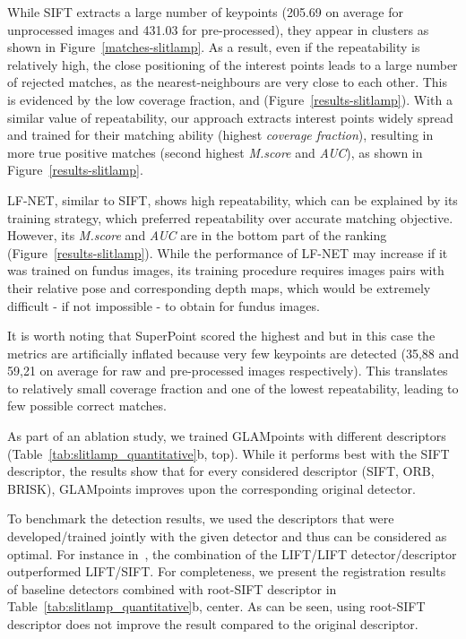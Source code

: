



While \ac{SIFT} extracts a large number of keypoints (205.69 on average for unprocessed images and 431.03 for pre-processed), they appear in clusters as shown in Figure~\ref{matches-slitlamp}. As a result, even if the repeatability is relatively high, the close positioning of the interest points leads to a large number of rejected matches, as the nearest-neighbours are very close to each other. This is evidenced by the low coverage fraction,  and  (Figure~\ref{results-slitlamp}). With a similar value of repeatability, our approach extracts interest points widely spread and trained for their matching ability (highest \textit{coverage fraction}), resulting in more true positive matches (second highest \textit{M.score} and \textit{AUC}), as shown in Figure~\ref{results-slitlamp}. 

\ac{LF-NET}, similar to SIFT, shows high repeatability, which can be explained by its training strategy, which preferred repeatability over accurate matching objective. However, its \textit{M.score} and \textit{AUC} are in the bottom part of the ranking (Figure~\ref{results-slitlamp}). While the performance of \ac{LF-NET} may increase if it was trained on fundus images, its training procedure requires images pairs with their relative pose and corresponding depth maps, which would be extremely difficult - if not impossible - to obtain for fundus images. 

It is worth noting that SuperPoint scored the highest  and  but in this case the metrics are artificially inflated because very few keypoints are detected (35,88 and 59,21 on average for raw and pre-processed images respectively). This translates to  relatively small coverage fraction and one of the lowest repeatability, leading to few possible correct matches. 


As part of an ablation study, we trained GLAMpoints with different descriptors (Table~\ref{tab:slitlamp_quantitative}b, top). While it performs best with the SIFT descriptor, the results show that for every considered descriptor (SIFT, ORB, BRISK), GLAMpoints improves upon the corresponding original detector.

To benchmark the detection results, we used the descriptors that were developed/trained jointly with the given detector and thus can be considered as optimal. For instance in~\cite{LIFT}, the combination of the LIFT/LIFT detector/descriptor outperformed LIFT/SIFT. For completeness, we present the registration results of baseline detectors combined with root-SIFT descriptor in Table~\ref{tab:slitlamp_quantitative}b, center.  As can be seen, using root-SIFT descriptor does not improve the result compared to the original descriptor.

